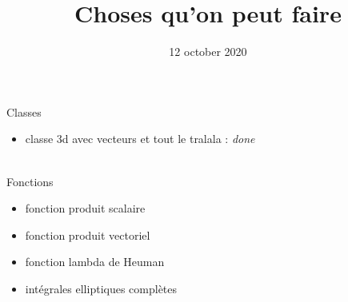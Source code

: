 \documentclass[a4paper,1pt]{article}
\title{Choses qu'on peut faire}
\date{12 october 2020}
\begin{document}
\maketitle

Classes
\begin{itemize}
    \item classe 3d avec vecteurs et tout le tralala : \emph{done}
\end{itemize}
~\\

Fonctions
\begin{itemize}
    \item fonction produit scalaire
    \item fonction produit vectoriel 
    \item fonction lambda de Heuman
    \item intégrales elliptiques complètes
\end{itemize}
\end{document}
